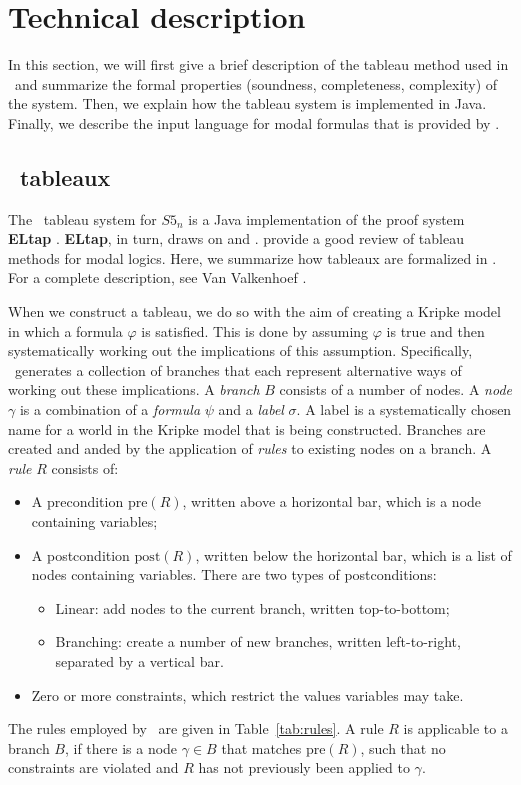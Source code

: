 \section{Technical description}
\label{sec:technical}

In this section, we will first give a brief description of the tableau method
used in \oops\ and summarize the formal properties (soundness, completeness,
complexity) of the system. Then, we explain how the
tableau system is implemented in Java. Finally, we describe the input language
for modal formulas that is provided by \oops.

\subsection{\oops\ tableaux}
\label{sec:}

The \oops\ tableau system for $S5_n$ is a Java \citep{gosling2005}
implementation of the proof system {\bf ELtap} \citep{deboer2007, deboer2006}.  {\bf
ELtap}, in turn, draws on \citet{fitting1999} and \citet{beckert1997}.
\citet{halpern1992} provide a good review of tableau methods for modal logics.
Here, we summarize how tableaux are formalized in \oops. For a complete
description, see Van Valkenhoef \citep{valkenhoef2008}.

When we construct a tableau, we do so with the aim of creating a Kripke model
in which a formula $\varphi$ is satisfied. This is done by assuming $\varphi$
is true and then systematically working out the implications of this
assumption. Specifically, \oops\ generates a collection of branches that each
represent alternative ways of working out these implications. A {\em branch}
$B$ consists of a number of nodes. A {\em node} $\gamma$ is a combination of a
{\em formula} $\psi$ and a {\em label} $\sigma$. A label is a systematically
chosen name for a world in the Kripke model that is being constructed. Branches
are created and 
anded by the application of {\em rules} to existing nodes on
a branch. A {\em rule} $R$ consists of:

\begin{itemize}
\item A precondition $\mathrm{pre}(R)$, written above a horizontal bar, which
is a node containing variables;
\item A postcondition $\mathrm{post}(R)$, written below the horizontal bar,
which is a list of nodes containing variables. There are two types of
postconditions:
\begin{itemize}
\item Linear: add nodes to the current branch, written top-to-bottom;
\item Branching: create a number of new branches, written left-to-right, separated by a vertical bar.
\end{itemize}
\item Zero or more constraints, which restrict the values variables may take.
\end{itemize}
The rules employed by \oops\ are given in Table~\ref{tab:rules}. A rule $R$ is
applicable to a branch $B$, if there is a node $\gamma \in B$ that matches
$\mathrm{pre}(R)$, such that no constraints are violated and $R$ has not
previously been applied to $\gamma$.

